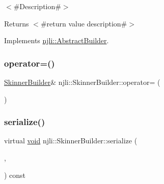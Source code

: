 $<$\#\+Description\#$>$

\begin{DoxyReturn}{Returns}
$<$\#return value description\#$>$ 
\end{DoxyReturn}


Implements \mbox{\hyperlink{classnjli_1_1_abstract_builder_a3e6e553e06d1ca30517ad5fb0bd4d000}{njli\+::\+Abstract\+Builder}}.

\mbox{\label{classnjli_1_1_skinner_builder_af133f1d86503b5839870ba8d16c83ec5}} 
\subsubsection{\texorpdfstring{operator=()}{operator=()}}
{\footnotesize\ttfamily \mbox{\hyperlink{classnjli_1_1_skinner_builder}{Skinner\+Builder}}\& njli\+::\+Skinner\+Builder\+::operator= (\begin{DoxyParamCaption}\item[{const \mbox{\hyperlink{classnjli_1_1_skinner_builder}{Skinner\+Builder}} \&}]{ }\end{DoxyParamCaption})\hspace{0.3cm}{\ttfamily [protected]}}

\mbox{\label{classnjli_1_1_skinner_builder_a25ac6b4e538b33329b9a54a03eea67c4}} 
\subsubsection{\texorpdfstring{serialize()}{serialize()}}
{\footnotesize\ttfamily virtual \mbox{\hyperlink{_thread_8h_af1e856da2e658414cb2456cb6f7ebc66}{void}} njli\+::\+Skinner\+Builder\+::serialize (\begin{DoxyParamCaption}\item[{\mbox{\hyperlink{_thread_8h_af1e856da2e658414cb2456cb6f7ebc66}{void}} $\ast$}]{,  }\item[{bt\+Serializer $\ast$}]{ }\end{DoxyParamCaption}) const\hspace{0.3cm}{\ttfamily [virtual]}}

